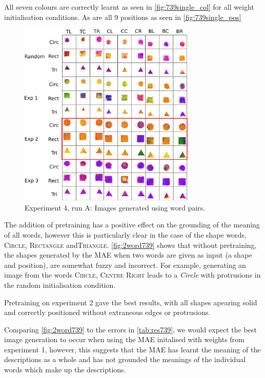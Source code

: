 All seven colours are correctly learnt as seen in \autoref{fig:739single_col} for all weight initialisation conditions. As are all 9 positions as seen in \autoref{fig:739single_pos}




\begin{figure}[h!]
\centering
\includegraphics[width=0.75\textwidth]{Figs/shapes/2word739_pos.png}
\caption{Experiment 4, run A: Images generated using word pairs.}
\label{fig:2word739}
\end{figure}

The addition of pretraining has a positive effect on the grounding of the meaning of all words, however this is particularly clear in the case of the shape words, \textsc{Circle}, \textsc{Rectangle} and\textsc{Triangle}. \autoref{fig:2word739} shows that without pretraining, the shapes generated by the \ac{MAE} when two words are given as input (a shape and position), are somewhat fuzzy and incorrect. For example, generating an image from the words \textsc{Circle, Centre Right} leads to a \textit{Circle} with protrusions in the random initialisation condition.

Pretraining on experiment 2 gave the best results, with all shapes apearing solid and correctly positioned without extraneous edges or protrusions. 

Comparing \autoref{fig:2word739} to the errors in \autoref{tab:res739}, we would expect the best image generation to occur when using the \ac{MAE} initalised with weights from experiment 1, however, this suggests that the \ac{MAE} has learnt the meaning of the descriptions as a whole and has not grounded the meanings of the individual words which make up the descriptions.


